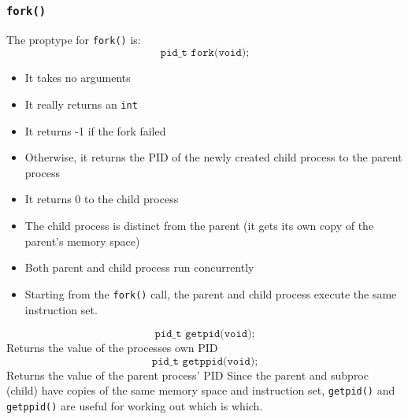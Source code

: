 \documentclass[a4paper, 10pt]{article}
\begin{document}
\subsubsection*{\texttt{fork()}}
The proptype for \texttt{fork()} is:
$$\texttt{pid\_t fork(void);}$$
\begin{itemize}
    \item It takes no arguments
    \item It really returns an \texttt{int}
    \item It returns -1 if the fork failed
    \item Otherwise, it returns the PID of the newly created child process to the parent process
    \item It returns 0 to the child process
    \item The child process is distinct from the parent (it gets its own copy of the parent's memory space)
    \item Both parent and child process run concurrently
    \item Starting from the \texttt{fork()} call, the parent and child process execute the same instruction set.
\end{itemize}
$$\texttt{pid\_t getpid(void);}$$
Returns the value of the processes own PID
$$\texttt{pid\_t getppid(void);}$$
Returns the value of the parent process' PID
Since the parent and subproc (child) have copies of the same memory space and instruction set, \texttt{getpid()}  and \texttt{getppid()} are useful for working out which is which.
\end{document}

